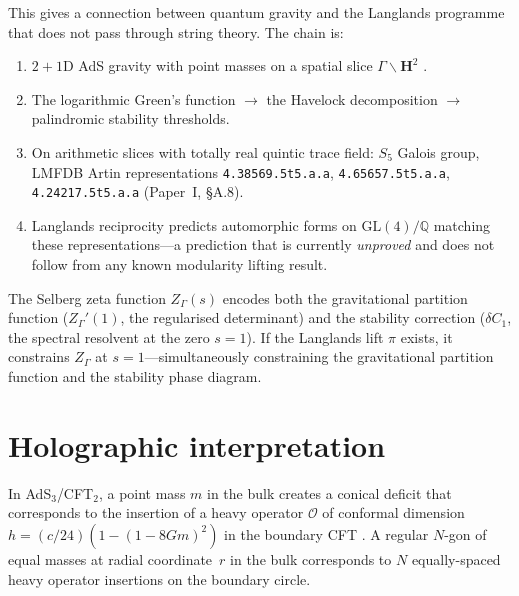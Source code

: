 This gives a connection between quantum gravity and the
Langlands programme that does not pass through string theory.
The chain is:
\begin{enumerate}
  \item $2{+}1$D AdS gravity with point masses on a spatial
    slice $\Gamma\backslash\mathbf{H}^2$
    \citep{DeserJackiw1984}.
  \item The logarithmic Green's function
    $\to$ the Havelock decomposition
    $\to$ palindromic stability thresholds.
  \item On arithmetic slices with totally real quintic trace
    field: $S_5$ Galois group, LMFDB Artin representations
    \texttt{4.38569.5t5.a.a}, \texttt{4.65657.5t5.a.a},
    \texttt{4.24217.5t5.a.a} (Paper~I, \S A.8).
  \item Langlands reciprocity predicts automorphic forms on
    $\mathrm{GL}(4)/\mathbb{Q}$ matching these
    representations---a prediction that is currently
    \emph{unproved} and does not follow from any known
    modularity lifting result.
\end{enumerate}
The Selberg zeta function $Z_\Gamma(s)$ encodes both the
gravitational partition function ($Z_\Gamma'(1)$, the
regularised determinant) and the stability correction
($\delta C_1$, the spectral resolvent at the zero $s = 1$).
If the Langlands lift $\pi$ exists, it constrains $Z_\Gamma$
at $s = 1$---simultaneously constraining the gravitational
partition function and the stability phase diagram.

\section{Holographic interpretation}
\label{sec:holographic}

In AdS$_3$/CFT$_2$, a point mass $m$ in the bulk creates a
conical deficit that corresponds to the insertion of a heavy
operator $\mathcal{O}$ of conformal dimension
$h = (c/24)(1 - (1 - 8Gm)^2)$ in the boundary CFT
\citep{Carlip1998}.
A regular $N$-gon of equal masses at radial coordinate~$r$
in the bulk corresponds to $N$ equally-spaced heavy operator
insertions on the boundary circle.

